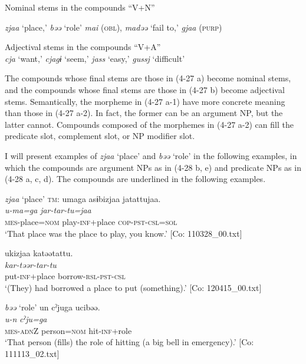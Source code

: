 \ea \label{ex:4.27}
\ea Nominal stems in the compounds “V+N” \label{ex:4.27a}
\begin{xlisti} \ex  \textit{zjaa} ‘place,’ \textit{bəə} ‘role’
\ex \textit{mai} (\textsc{obl}), \textit{madəə} ‘fail to,’ \textit{gjaa} (\textsc{purp})
\end{xlisti}
\ex Adjectival stems in the compounds “V+A”\\\label{ex:4.27b}
    \textit{cja} ‘want,’ \textit{cjagɨ} ‘seem,’ \textit{jass} ‘easy,’ \textit{gussj} ‘difficult’
\z
\z  

The compounds whose final stems are those in (4-27 a) become nominal stems, and the compounds whose final stems are those in (4-27 b) become adjectival stems. Semantically, the morpheme in (4-27 a-1) have more concrete meaning than those in (4-27 a-2). In fact, the former can be an argument NP, but the latter cannot. Compounds composed of the morphemes in (4-27 a-2) can fill the predicate slot, complement slot, or NP modifier slot.

I will present examples of \textit{zjaa} ‘place’ and \textit{bəə} ‘role’ in the following examples, in which the compounds are argument NPs as in (4-28 b, e) and predicate NPs as in (4-28 a, c, d). The compounds are underlined in the following examples.

\ea  \textit{zjaa} ‘place’ \label{ex:4.28}
\ea\label{ex:4.28a}
\glll  \textsc{tm}:  umaga  asɨbizjaa  jatattujaa.\\
      \textit{u-ma=ga}  \textit{}  \textit{jar-tar-tu=jaa}\\
      \textsc{mes}-place=\textsc{nom}  play-\textsc{inf}+place  \textsc{cop}-\textsc{pst}-\textsc{csl}=\textsc{sol}\\
      \glt       ‘That place was the place to play, you know.’ [Co: 110328\_00.txt]

\ex\label{ex:4.28b}
  \glll  ukizjaa  katəətattu.\\
      \textit{}  \textit{kar-təər-tar-tu}\\
      put-\textsc{inf}+place  borrow-\textsc{rsl}-\textsc{pst}-\textsc{csl}\\
      \glt       ‘(They) had borrowed a place to put (something).’ [Co: 120415\_00.txt]

\exi{} \textit{bəə} ‘role’
\ex\label{ex:4.28c}
\glll  un  cˀjuga  ucibəə.\\
      \textit{u-n}  \textit{cˀju=ga}  \textit{}\\
      \textsc{mes}-\textsc{adn}Z  person=\textsc{nom}  hit-\textsc{inf}+role\\
      \glt       ‘That person (fills) the role of hitting (a big bell in emergency).’ [Co: 111113\_02.txt]

